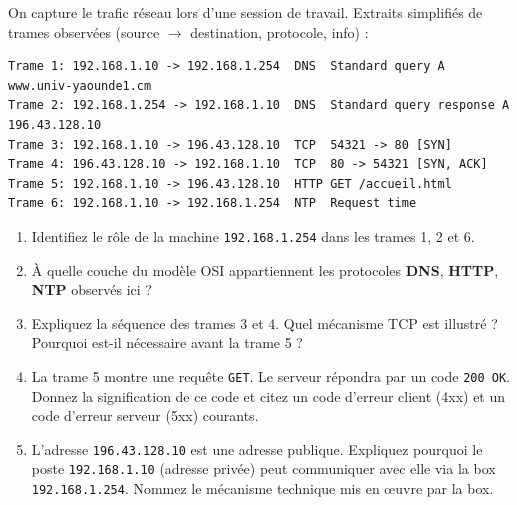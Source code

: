 \documentclass[11pt]{article}
\begin{document}
\begin{exercice}
On capture le trafic réseau lors d'une session de travail. Extraits simplifiés de trames observées (source $\rightarrow$ destination, protocole, info) :

\begin{verbatim}
Trame 1: 192.168.1.10 -> 192.168.1.254  DNS  Standard query A www.univ-yaounde1.cm
Trame 2: 192.168.1.254 -> 192.168.1.10  DNS  Standard query response A 196.43.128.10
Trame 3: 192.168.1.10 -> 196.43.128.10  TCP  54321 -> 80 [SYN]
Trame 4: 196.43.128.10 -> 192.168.1.10  TCP  80 -> 54321 [SYN, ACK]
Trame 5: 192.168.1.10 -> 196.43.128.10  HTTP GET /accueil.html
Trame 6: 192.168.1.10 -> 192.168.1.254  NTP  Request time
\end{verbatim}

\begin{enumerate}
    \item Identifiez le rôle de la machine \texttt{192.168.1.254} dans les trames 1, 2 et 6.
    \item À quelle couche du modèle OSI appartiennent les protocoles \textbf{DNS}, \textbf{HTTP}, \textbf{NTP} observés ici ?
    \item Expliquez la séquence des trames 3 et 4. Quel mécanisme TCP est illustré ? Pourquoi est-il nécessaire avant la trame 5 ?
    \item La trame 5 montre une requête \texttt{GET}. Le serveur répondra par un code \texttt{200 OK}. Donnez la signification de ce code et citez un code d'erreur client (4xx) et un code d'erreur serveur (5xx) courants.
    \item L'adresse \texttt{196.43.128.10} est une adresse publique. Expliquez pourquoi le poste \texttt{192.168.1.10} (adresse privée) peut communiquer avec elle via la box \texttt{192.168.1.254}. Nommez le mécanisme technique mis en œuvre par la box.
\end{enumerate}
\end{exercice}
\end{document}

